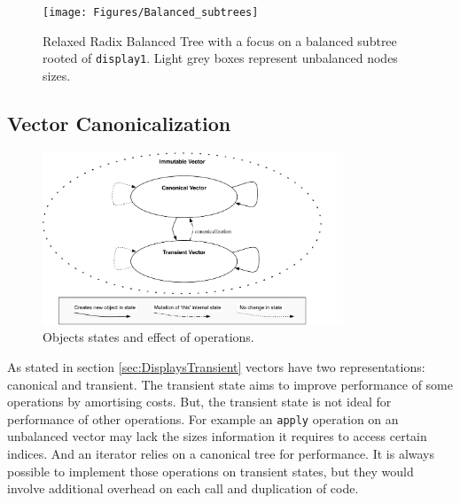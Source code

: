\begin{figure}[h!]
  \centering
  \texttt{[image: Figures/Balanced\_subtrees]}
  \caption{Relaxed Radix Balanced Tree with a focus on a balanced subtree rooted of \texttt{display1}. Light grey boxes represent unbalanced nodes sizes.}
  \label{Balanced_subtrees}
\end{figure}


\subsection{Vector Canonicalization}
\label{VectorCanonicalization}

\begin{figure}[h!]
  \centering
  \includegraphics[width=0.8\textwidth]{Figures/StatesGraphRealySimple}
  \caption{Objects states and effect of operations.}
  \label{StatesGraphRealySimple}
\end{figure}

As stated in section \ref{sec:DisplaysTransient} vectors have two representations: canonical and transient. The transient state aims to improve performance of some operations by amortising costs. But, the transient state is not ideal for performance of other operations. For example an \texttt{apply} operation on an unbalanced vector may lack the sizes information it requires to access certain indices. And an iterator relies on a canonical tree for performance. It is always possible to implement those operations on transient states, but they would involve additional overhead on each call and duplication of code.

